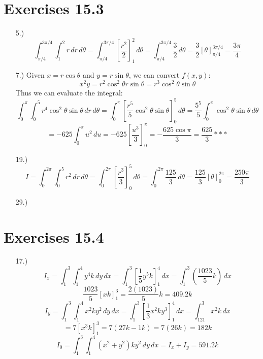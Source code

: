 \documentclass[12pt]{article}
\newcommand{\bracks}[1]{\left[#1\right]}
\newcommand{\parns}[1]{\left(#1\right)}
\begin{document}
\section*{Exercises 15.3}
\begin{itemize}
    \item [5.)] \[\int^{3\pi/4}_{\pi/4}\int^2_1r\,dr\,d\theta=\int^{3\pi/4}_{\pi/4}\bracks{\frac{r^2}{2}}^2_1\,d\theta=\int^{3\pi/4}_{\pi/4}\frac{3}{2}\,d\theta=\frac{3}{2}\bracks{\theta}^{3\pi/4}_{\pi/4}=\frac{3\pi}{4}\]

    \item [7.)] Given $x=r\cos\theta$ and $y=r\sin\theta$, we can convert $f(x,y)$:
    \[x^2y=r^2\cos^2\theta r\sin\theta=r^3\cos^2\theta\sin\theta\]
    Thus we can evaluate the integral:
    \[\int^\pi_0\int^5_0 r^4\cos^2\theta\sin\theta\,dr\,d\theta=\int^\pi_0\bracks{\frac{r^5}{5}\cos^2\theta\sin\theta}^5_0\,d\theta=\frac{5^5}{5}\int^\pi_0\cos^2\theta\sin\theta\,d\theta\]
    \[=-625\int^\pi_0u^2\,du=-625\bracks{\frac{u^3}{3}}^\pi_0=-\frac{625\cos\pi}{3}=\frac{625}{3}***\]

    \item [19.)] \[I=\int^{2\pi}_0\int^5_0r^2\,dr\,d\theta=\int^{2\pi}_0\bracks{\frac{r^3}{3}}^5_0\,d\theta=\int^{2\pi}_0\frac{125}{3}\,d\theta=\frac{125}{3}\bracks{\theta}^{2\pi}_0=\frac{250\pi}{3}\]

    \item [29.)]

\end{itemize}

\section*{Exercises 15.4}
\begin{itemize}
    \item [17.)] \[I_x=\int^3_1\int^4_1y^4k\,dy\,dx=\int^3_1\bracks{\frac{1}{5}y^5k}^4_1\,dx=\int^3_1\parns{\frac{1023}{5}k}\,dx\]
    \[\frac{1023}{5}\bracks{xk}^3_1=\frac{2(1023)}{5}k=409.2k\]
    \[I_y=\int^3_1\int^4_1x^2ky^2\,dy\,dx=\int^3_1\bracks{\frac{1}{3}x^2ky^3}^4_1\,dx=\int^3_121x^2k\,dx\]
    \[=7\bracks{x^3k}^3_1=7(27k-1k)=7(26k)=182k\]
    \[I_0=\int^3_1\int^4_1(x^2+y^2)ky^2\,dy\,dx=I_x+I_y=591.2k\]

\end{itemize}
\end{document}
